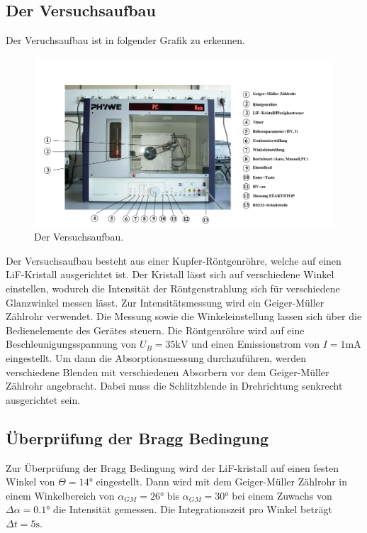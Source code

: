 \subsection{Der Versuchsaufbau}
\label{sec:Versuchsaufbau}
Der Veruchsaufbau ist in folgender Grafik zu erkennen.
\begin{figure}[H]
  \centering
  \includegraphics[scale=0.5]{"content/aufbau.png"}
  \caption{Der Versuchsaufbau.}
  \label{fig:aufbaudurchführung}
\end{figure}
\noindent
Der Versuchsaufbau besteht aus einer Kupfer-Röntgenröhre, welche auf einen LiF-Kristall
ausgerichtet ist. Der Kristall lässt sich auf verschiedene Winkel einstellen,
wodurch die Intensität der Röntgenstrahlung sich für verschiedene Glanzwinkel
messen lässt. Zur Intensitätsmessung wird ein Geiger-Müller Zählrohr verwendet.
Die Messung sowie die Winkeleinstellung lassen sich über die Bedienelemente des
Gerätes steuern. Die Röntgenröhre wird auf eine Beschleunigungsspannung von
$U_B = 35 \si{\kilo\volt}$ und einen Emissionstrom von $I = 1 \si{\milli\ampere}$
eingestellt. Um dann die Absorptionsmessung durchzuführen, werden verschiedene
Blenden mit verschiedenen Absorbern vor dem Geiger-Müller Zählrohr angebracht.
Dabei muss die Schlitzblende in Drehrichtung senkrecht ausgerichtet sein.

\subsection{Überprüfung der Bragg Bedingung}
Zur Überprüfung der Bragg Bedingung wird der LiF-kristall auf einen festen Winkel
von $\Theta = 14 \si{\degree}$ eingestellt. Dann wird mit dem Geiger-Müller Zählrohr
in einem Winkelbereich von $\alpha_{GM} = 26 \si{\degree}$ bis $\alpha_{GM} = 30 \si{\degree}$
bei einem Zuwachs von $\Delta \alpha = 0.1 \si{\degree}$ die Intensität gemessen.
Die Integrationszeit pro Winkel beträgt $\Delta t = 5 \si{\second}$.

